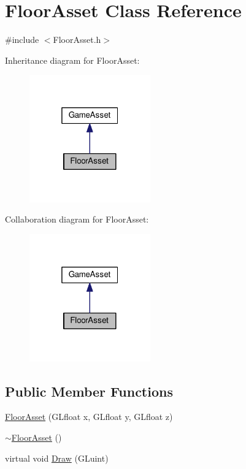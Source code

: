 \hypertarget{classFloorAsset}{}\section{Floor\+Asset Class Reference}
\label{classFloorAsset}


{\ttfamily \#include $<$Floor\+Asset.\+h$>$}



Inheritance diagram for Floor\+Asset\+:
\nopagebreak
\begin{figure}[H]
\begin{center}
\leavevmode
\includegraphics[width=148pt]{classFloorAsset__inherit__graph}
\end{center}
\end{figure}


Collaboration diagram for Floor\+Asset\+:
\nopagebreak
\begin{figure}[H]
\begin{center}
\leavevmode
\includegraphics[width=148pt]{classFloorAsset__coll__graph}
\end{center}
\end{figure}
\subsection*{Public Member Functions}
\begin{DoxyCompactItemize}
\item 
\hyperlink{classFloorAsset_a383f25a2759fabab5c91702481c373a5}{Floor\+Asset} (G\+Lfloat x, G\+Lfloat y, G\+Lfloat z)
\item 
\hyperlink{classFloorAsset_a7d782882bb08ee2a2285821275383856}{$\sim$\+Floor\+Asset} ()
\item 
virtual void \hyperlink{classFloorAsset_a14650eb2c2cd75e990c351bad8636279}{Draw} (G\+Luint)
\end{DoxyCompactItemize}
